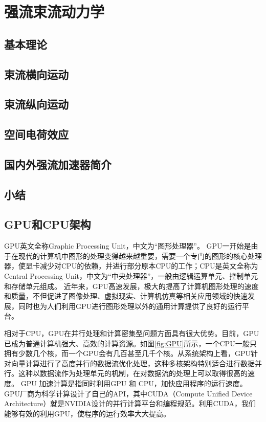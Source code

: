 
\chapter{强流束流动力学}
\label{chap:AccBasic}

\section{基本理论}
\section{束流横向运动}
\section{束流纵向运动}
\section{空间电荷效应}
\section{国内外强流加速器简介}
\section{小结}


\section{GPU和CPU架构}
GPU英文全称Graphic Processing Unit，中文为“图形处理器”。
GPU一开始是由于在现代的计算机中图形的处理变得越来越重要，需要一个专门的图形的核心处理器，使显卡减少对CPU的依赖，并进行部分原本CPU的工作；CPU是英文全称为Central Processing Unit，中文为“中央处理器”，一般由逻辑运算单元、控制单元和存储单元组成。
近年来，GPU高速发展，极大的提高了计算机图形处理的速度和质量，不但促进了图像处理、虚拟现实、计算机仿真等相关应用领域的快速发展，同时也为人们利用GPU进行图形处理以外的通用计算提供了良好的运行平台。

相对于CPU，GPU在并行处理和计算密集型问题方面具有很大优势。目前，GPU已成为普通计算机强大、高效的计算资源。如图\ref{fig:GPU}所示，一个CPU一般只拥有少数几个核，而一个GPU会有几百甚至几千个核。从系统架构上看，GPU针对向量计算进行了高度并行的数据流优化处理，这种多核架构特别适合进行数据并行。这种以数据流作为处理单元的机制，在对数据流的处理上可以取得很高的速度。
GPU 加速计算是指同时利用GPU 和 CPU，加快应用程序的运行速度\cite{gpu2008}。GPU厂商为科学计算设计了自己的API，其中CUDA（Compute Unified Device Architecture）就是NVIDIA设计的并行计算平台和编程规范\cite{nvidia2010programming}。利用CUDA，我们能够有效的利用GPU，使程序的运行效率大大提高。

